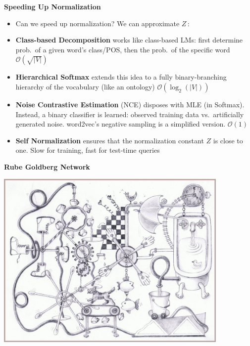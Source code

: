 \documentclass{beamer}
\newcommand{\detail}[1]{{\color{lightgrey}\small{}#1}}
\newcommand{\pagestepalt}[2]{
  \begin{frame}[t]
    \begin{minipage}[t][0.26\textheight][t]{\textwidth}
      \begin{center}
        \huge
        \textbf{#1}
      \end{center}
    \end{minipage}
    
    \begin{minipage}[t][0.7\textheight][c]{\textwidth}
      #2
    \end{minipage}
  \end{frame}
}
\begin{document}
\pagestepalt{Speeding Up Normalization}{
\begin{itemize}[<+->]
	\item Can we speed up normalization? We can approximate $Z$\,:
	\item \textbf{Class-based Decomposition} works like class-based LMs: first determine prob.\ of a given word's class/POS, then the prob.\ of the specific word \detail{$\mathcal{O} ( \sqrt{|V|} )$}
	\item \textbf{Hierarchical Softmax} extends this idea to a fully binary-branching hierarchy of the vocabulary (like an ontology) \detail{$\mathcal{O} (\log_2(|V|) ) $ }
	\item \textbf{Noise Contrastive Estimation} (NCE) disposes with MLE (in Softmax).  Instead, a binary classifier is learned: observed training data vs.\ artificially generated noise.  word2vec's negative sampling is a simplified version. \detail{$\mathcal{O} (1) $}
	\item \textbf{Self Normalization} ensures that the normalization constant $Z$ is close to one. Slow for training, fast for test-time queries
\end{itemize}
}

\pagestepalt{Rube Goldberg Network}{
  \vspace{-0.7cm}
\begin{center}
\includegraphics[width=0.85\textwidth]{../images/rube_goldberg_machine.jpg}
\end{center}
}
\end{document}
